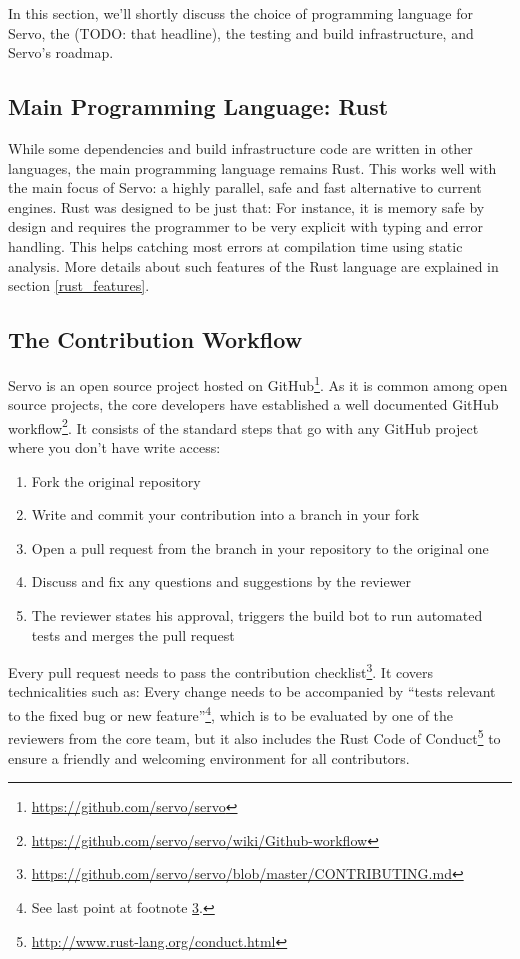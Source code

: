 \documentclass{scrartcl}
\newcommand{\todo}[1] {{\color{red}(TODO: #1)}}
\begin{document}
In this section, we'll shortly discuss the choice of programming language for Servo, the \todo{that headline}, the testing and build infrastructure, and Servo's roadmap.


\subsection{Main Programming Language: Rust}

While some dependencies and build infrastructure code are written in other languages, the main programming language remains Rust. This works well with the main focus of Servo: a highly parallel, safe and fast alternative to current engines. Rust was designed to be just that: For instance, it is memory safe by design and requires the programmer to be very explicit with typing and error handling. This helps catching most errors at compilation time using static analysis. More details about such features of the Rust language are explained in section \ref{rust_features}.


\subsection{The Contribution Workflow}

Servo is an open source project hosted on GitHub\footnote{\url{https://github.com/servo/servo}}. As it is common among open source projects, the core developers have established a well documented GitHub workflow\footnote{\url{https://github.com/servo/servo/wiki/Github-workflow}}. It consists of the standard steps that go with any GitHub project where you don't have write access:
\begin{enumerate}
    \item Fork the original repository
    \item Write and commit your contribution into a branch in your fork
    \item Open a pull request from the branch in your repository to the original one
    \item Discuss and fix any questions and suggestions by the reviewer
    \item The reviewer states his approval, triggers the build bot to run automated tests and merges the pull request
\end{enumerate}

Every pull request needs to pass the contribution checklist\footnote{\label{contributing}\url{https://github.com/servo/servo/blob/master/CONTRIBUTING.md}}. It covers technicalities such as: Every change needs to be accompanied by ``tests relevant to the fixed bug or new feature''\footnote{See last point at footnote \ref{contributing}.},  which is to be evaluated by one of the reviewers from the core team, but it also includes the Rust Code of Conduct\footnote{\url{http://www.rust-lang.org/conduct.html}} to ensure a friendly and welcoming environment for all contributors.  \\
  
\end{document}
